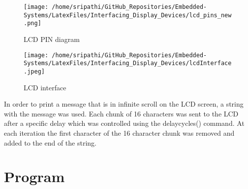\documentclass[12pt, letterpaper]{article}
\begin{document}
\begin{figure}[!h]
	\centering
	\texttt{[image: /home/sripathi/GitHub\_Repositories/Embedded-Systems/LatexFiles/Interfacing\_Display\_Devices/lcd\_pins\_new.png]}
	\caption{LCD PIN diagram}
	\label{fig:lcdPinout}
\end{figure} 

\begin{figure}[!h]
	\centering
	\texttt{[image: /home/sripathi/GitHub\_Repositories/Embedded-Systems/LatexFiles/Interfacing\_Display\_Devices/lcdInterface.jpeg]}
	\caption{LCD interface}
	\label{fig:lcdInterface}
\end{figure} 

In order to print a message that is in infinite scroll on the LCD screen, a string with the message was used. Each chunk of 16 characters was sent to the LCD after a specific delay which was controlled using the delaycycles() command. At each iteration the first character of the 16 character chunk was removed and added to the end of the string.
\newpage
\section{Program}
\end{document}
